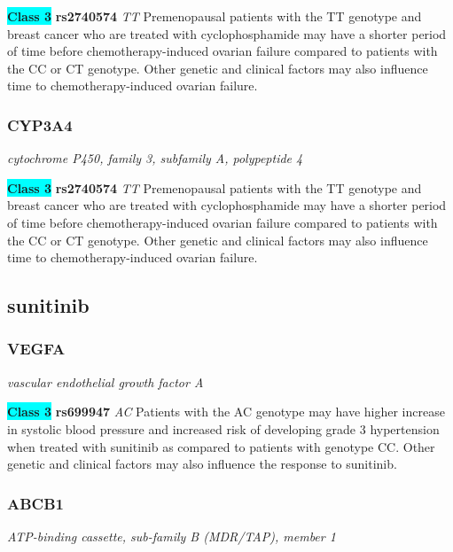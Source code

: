 \documentclass{report}
\begin{document}
\textbf{\colorbox{cyan} {Class 3}} \textbf{ rs2740574 } \textit{ TT }
Premenopausal patients with the TT genotype and breast cancer who are treated with cyclophosphamide may have a shorter period of time before chemotherapy-induced ovarian failure compared to patients with the CC or CT genotype. Other genetic and clinical factors may also influence time to chemotherapy-induced ovarian failure.\newline\subsubsection{ CYP3A4 }
\textit{ cytochrome P450, family 3, subfamily A, polypeptide 4 }

\textbf{\colorbox{cyan} {Class 3}} \textbf{ rs2740574 } \textit{ TT }
Premenopausal patients with the TT genotype and breast cancer who are treated with cyclophosphamide may have a shorter period of time before chemotherapy-induced ovarian failure compared to patients with the CC or CT genotype. Other genetic and clinical factors may also influence time to chemotherapy-induced ovarian failure.\newline\subsection{ sunitinib }\subsubsection{ VEGFA }
\textit{ vascular endothelial growth factor A }

\textbf{\colorbox{cyan} {Class 3}} \textbf{ rs699947 } \textit{ AC }
Patients with the AC genotype may have higher increase in systolic blood pressure and increased risk of developing grade 3 hypertension when treated with sunitinib as compared to patients with genotype CC. Other genetic and clinical factors may also influence the response to sunitinib.\newline\subsubsection{ ABCB1 }
\textit{ ATP-binding cassette, sub-family B (MDR/TAP), member 1 }
\end{document}
